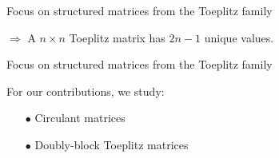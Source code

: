 \begin{frame}{Focus on structured matrices from the Toeplitz family}
\begin{figure}
\begin{subfigure}[b]{0.3\textwidth}
      \caption*{}
    \end{subfigure}
  \end{figure}

  $\Rightarrow$ A $n \times n$ Toeplitz matrix has $2n - 1$ unique values. 


\end{frame}



\begin{frame}{Focus on structured matrices from the Toeplitz family}
  
  For our contributions, we study:
  \begin{itemize}
    \item[$\bullet$] Circulant matrices
    \item[$\bullet$] Doubly-block Toeplitz matrices
  \end{itemize}

\end{frame}


